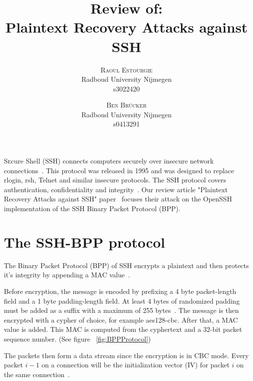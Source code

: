 \documentclass[twocolumn]{article}
\title{\vspace{-15mm}%
	\fontsize{24pt}{10pt}\selectfont
	\textbf{Review of:\\Plaintext Recovery Attacks against SSH}
	}
\author{%
	\large
	\textsc{Raoul Estourgie} \\[2mm]
	\normalsize	Radboud University Nijmegen \\
	\normalsize	s3022420
	\vspace{-5mm}
	\and 
	\large
	\textsc{Ben Br\"ucker} \\[2mm]
	\normalsize	Radboud University Nijmegen \\
	\normalsize	s0413291
	\vspace{-5mm}
	}
\date{}
\begin{document}

\thispagestyle{fancy}

\lettrine[nindent=0em,lines=3]{S} ecure Shell (SSH) connects computers securely over insecure network connections~\cite{Ylonen2006}. This protocol was released in 1995 and was designed to replace rlogin, rsh, Telnet and similar insecure protocols. 
\indent The SSH protocol covers authentication, confidentiality and integrity~\cite{Barret2001}.
\indent Our review article "Plaintext Recovery Attacks against SSH" paper~\cite{Albrecht2009} focuses their attack on the OpenSSH implementation of the SSH Binary Packet Protocol (BPP).

\section{The SSH-BPP protocol}
\indent The Binary Packet Protocol (BPP) of SSH encrypts a plaintext and then protects it's integrity by appending a MAC value~\cite{Ylonen2006}.

\indent Before encryption, the message is encoded by prefixing a 4 byte packet-length field and a 1 byte padding-length field. At least 4 bytes of randomized padding must be added as a suffix with a maximum of 255 bytes~\cite{Albrecht2009}. The message is then encrypted with a cypher of choice, for example aes128-cbc. After that, a MAC value is added. This MAC is computed from the cyphertext and a 32-bit packet sequence number. (See figure ~\ref{fig:BPPProtocol})

\indent The packets then form a data stream since the encryption is in CBC mode. Every packet $i-1$ on a connection will be the initialization vector (IV) for packet $i$ on the same connection~\cite{Albrecht2009}.
\end{document}
